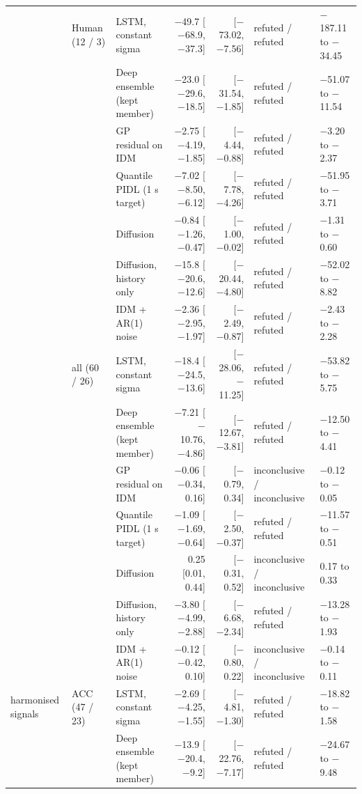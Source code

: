 \begin{longtable}{lllrrll}
\midrule
 & Human (12 / 3) & LSTM, constant sigma & $-$49.7 [$-$68.9, $-$37.3] & [$-$73.02, $-$7.56] & refuted / refuted & $-$187.11 to $-$34.45 \\
 &  & Deep ensemble (kept member) & $-$23.0 [$-$29.6, $-$18.5] & [$-$31.54, $-$1.85] & refuted / refuted & $-$51.07 to $-$11.54 \\
 &  & GP residual on IDM & $-$2.75 [$-$4.19, $-$1.85] & [$-$4.44, $-$0.88] & refuted / refuted & $-$3.20 to $-$2.37 \\
 &  & Quantile PIDL (1 s target) & $-$7.02 [$-$8.50, $-$6.12] & [$-$7.78, $-$4.26] & refuted / refuted & $-$51.95 to $-$3.71 \\
 &  & Diffusion & $-$0.84 [$-$1.26, $-$0.47] & [$-$1.00, $-$0.02] & refuted / refuted & $-$1.31 to $-$0.60 \\
 &  & Diffusion, history only & $-$15.8 [$-$20.6, $-$12.6] & [$-$20.44, $-$4.80] & refuted / refuted & $-$52.02 to $-$8.82 \\
 &  & IDM + AR(1) noise & $-$2.36 [$-$2.95, $-$1.97] & [$-$2.49, $-$0.87] & refuted / refuted & $-$2.43 to $-$2.28 \\
\midrule
 & all (60 / 26) & LSTM, constant sigma & $-$18.4 [$-$24.5, $-$13.6] & [$-$28.06, $-$11.25] & refuted / refuted & $-$53.82 to $-$5.75 \\
 &  & Deep ensemble (kept member) & $-$7.21 [$-$10.76, $-$4.86] & [$-$12.67, $-$3.81] & refuted / refuted & $-$12.50 to $-$4.41 \\
 &  & GP residual on IDM & $-$0.06 [$-$0.34, 0.16] & [$-$0.79, 0.34] & inconclusive / inconclusive & $-$0.12 to $-$0.05 \\
 &  & Quantile PIDL (1 s target) & $-$1.09 [$-$1.69, $-$0.64] & [$-$2.50, $-$0.37] & refuted / refuted & $-$11.57 to $-$0.51 \\
 &  & Diffusion & 0.25 [0.01, 0.44] & [$-$0.31, 0.52] & inconclusive / inconclusive & 0.17 to 0.33 \\
 &  & Diffusion, history only & $-$3.80 [$-$4.99, $-$2.88] & [$-$6.68, $-$2.34] & refuted / refuted & $-$13.28 to $-$1.93 \\
 &  & IDM + AR(1) noise & $-$0.12 [$-$0.42, 0.10] & [$-$0.80, 0.22] & inconclusive / inconclusive & $-$0.14 to $-$0.11 \\
\midrule
harmonised signals & ACC (47 / 23) & LSTM, constant sigma & $-$2.69 [$-$4.25, $-$1.55] & [$-$4.81, $-$1.30] & refuted / refuted & $-$18.82 to $-$1.58 \\
 &  & Deep ensemble (kept member) & $-$13.9 [$-$20.4, $-$9.2] & [$-$22.76, $-$7.17] & refuted / refuted & $-$24.67 to $-$9.48 \\

\end{longtable}
